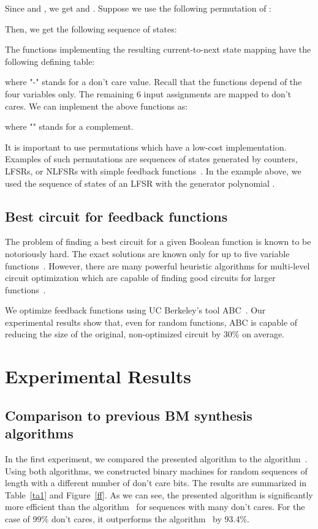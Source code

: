 \documentclass[10pt,conference]{IEEEtran}
\begin{document}
Since  and , we get
 and . Suppose we use the following permutation
of :

Then, we get the following sequence of states:

The functions implementing the resulting 
current-to-next state mapping have the following defining table:

where "-" stands for a don't care value.
Recall that the functions depend of the four variables  only.
The remaining 6 input assignments are mapped to don't cares.
We can implement the above functions as:

where "" stands for a complement.

It is important to use permutations  which have a low-cost implementation.
Examples of such permutations are sequences of states generated by counters, LFSRs, or NLFSRs with simple feedback functions~\cite{Du12}. In the example above, we used the sequence of states of an LFSR with the generator polynomial .

\subsection{Best circuit for feedback functions}

The problem of finding a best circuit for a given Boolean function is known 
to be notoriously hard.
The exact solutions are known only for up to five variable functions~\cite{Kn98}.
However, there are many powerful heuristic algorithms for multi-level circuit optimization which are capable of finding good circuits for larger functions~\cite{espr}. 

We optimize feedback functions using UC Berkeley's tool ABC~\cite{abc}.
Our experimental results show that, even for random functions, ABC is 
capable of reducing the size of the original, non-optimized circuit by 30\% on average.

\section{Experimental Results} \label{exp}

\subsection{Comparison to previous BM synthesis algorithms}

In the first experiment, we compared the presented algorithm to the
algorithm~\cite{Du11a}. Using both algorithms, we constructed binary machines
for random sequences of length  with a different number of don't care bits.
The results are summarized in Table~\ref{ta1} and Figure~\ref{ff}. 
As we can see, the presented
algorithm is significantly more efficient than the algorithm~\cite{Du11a}
for sequences with many don't cares. For the case of 99\% don't cares, it
outperforms the algorithm~\cite{Du11a} by 93.4\%.  
\end{document}
